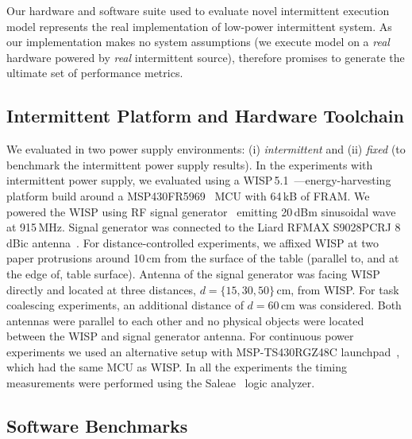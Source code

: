 Our hardware and software suite used to evaluate \sys novel intermittent execution model represents the  real implementation of low-power intermittent system. As our implementation makes no system assumptions (we execute \sys model on a \emph{real} hardware powered by \emph{real} intermittent source), therefore promises to generate the ultimate set of \sys performance metrics. 

\subsection{Intermittent Platform and Hardware Toolchain}
\label{sec:results_hardware_software}

We evaluated \sys in two power supply environments: (i)  \emph{intermittent} and (ii) \emph{fixed} (to benchmark the intermittent power supply results). In the experiments with intermittent power supply, we evaluated \sys using a WISP\,5.1~\cite{wisp5,wisp}---energy-harvesting platform build around a MSP430FR5969~\cite{wolverine} MCU with 64\,kB of FRAM. We powered the WISP using RF signal generator~\cite{} emitting 20\,dBm sinusoidal wave at 915\,MHz.  Signal generator was connected to the Liard RFMAX S9028PCRJ 8\,dBic antenna~\cite{atlas2015}. For distance-controlled experiments, we affixed WISP at two paper protrusions around 10\,cm from the surface of the table (parallel to, and at the edge of, table surface). Antenna of the signal generator was facing WISP directly and located at three distances, $d=\{15, 30, 50\}$\,cm, from WISP. For task coalescing experiments, an additional distance of $d=60$\,cm was considered. Both antennas were parallel to each other and no physical objects were located between the WISP and signal generator antenna. For continuous power experiments we used an alternative setup with MSP-TS430RGZ48C launchpad~\cite{}, which had the same MCU as WISP.  In all the experiments the timing measurements were performed using the Saleae~\cite{saleae} logic analyzer. 

\subsection{Software Benchmarks}
\label{sec:software_benchmarks}

